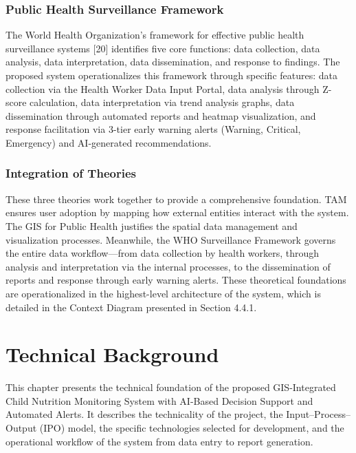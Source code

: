 \documentclass[12pt, a4paper]{report}
\begin{document}
\subsection{Public Health Surveillance Framework}
The World Health Organization's framework for effective public health surveillance systems [20] identifies five core functions: data collection, data analysis, data interpretation, data dissemination, and response to findings. The proposed system operationalizes this framework through specific features: data collection via the Health Worker Data Input Portal, data analysis through Z-score calculation, data interpretation via trend analysis graphs, data dissemination through automated reports and heatmap visualization, and response facilitation via 3-tier early warning alerts (Warning, Critical, Emergency) and AI-generated recommendations.

\subsection{Integration of Theories}
These three theories work together to provide a comprehensive foundation. TAM ensures user adoption by mapping how external entities interact with the system. The GIS for Public Health justifies the spatial data management and visualization processes. Meanwhile, the WHO Surveillance Framework governs the entire data workflow—from data collection by health workers, through analysis and interpretation via the internal processes, to the dissemination of reports and response through early warning alerts. These theoretical foundations are operationalized in the highest-level architecture of the system, which is detailed in the Context Diagram presented in Section 4.4.1.

\clearpage

\chapter{Technical Background}
\label{chap:technical}

This chapter presents the technical foundation of the proposed GIS-Integrated Child Nutrition Monitoring System with AI-Based Decision Support and Automated Alerts. It describes the technicality of the project, the Input--Process--Output (IPO) model, the specific technologies selected for development, and the operational workflow of the system from data entry to report generation.
\end{document}
